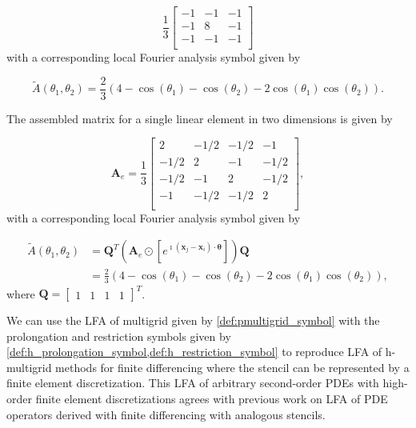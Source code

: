 \documentclass[review]{siamart190516}
\begin{document}
\begin{equation}
\frac{1}{3}
\begin{bmatrix}
-1  &  -1  &  -1  \\
-1  &   8  &  -1  \\
-1  &  -1  &  -1  \\
\end{bmatrix}
\end{equation}
with a corresponding local Fourier analysis symbol given by

\begin{equation}
\tilde{A} \left( \theta_1, \theta_2 \right) = \frac{2}{3} \left( 4 - \cos \left( \theta_1 \right) - \cos \left( \theta_2 \right) - 2 \cos \left( \theta_1 \right) \cos \left( \theta_2 \right) \right).
\end{equation}

The assembled matrix for a single linear element in two dimensions is given by

\begin{equation}
\mathbf{A}_e =
\frac{1}{3}
\begin{bmatrix}
 2    &  -1/2  &  -1/2  &  -1    \\
-1/2  &   2    &  -1    &  -1/2  \\
-1/2  &  -1    &   2    &  -1/2  \\
-1    &  -1/2  &  -1/2  &   2    \\
\end{bmatrix},
\end{equation}
with a corresponding local Fourier analysis symbol given by

\begin{equation}
\begin{split}
\tilde{A} \left( \theta_1, \theta_2 \right) & = \mathbf{Q}^T \left( \mathbf{A}_e \odot \left[ e^{\imath \left( \mathbf{x}_j - \mathbf{x}_i \right) \cdot \boldsymbol{\theta}} \right] \right) \mathbf{Q}\\ & = \frac{2}{3} \left( 4 - \cos \left( \theta_1 \right) - \cos \left( \theta_2 \right) - 2 \cos \left( \theta_1 \right) \cos \left( \theta_2 \right) \right),
\end{split}
\end{equation}
where $\mathbf{Q} = \begin{bmatrix} 1 & 1 & 1 & 1 \end{bmatrix}^T$.

We can use the LFA of multigrid given by \cref{def:pmultigrid_symbol} with the prolongation and restriction symbols given by \cref{def:h_prolongation_symbol,def:h_restriction_symbol} to reproduce LFA of h-multigrid methods for finite differencing where the stencil can be represented by a finite element discretization.
This LFA of arbitrary second-order PDEs with high-order finite element discretizations agrees with previous work on LFA of PDE operators derived with finite differencing with analogous stencils.
\end{document}
